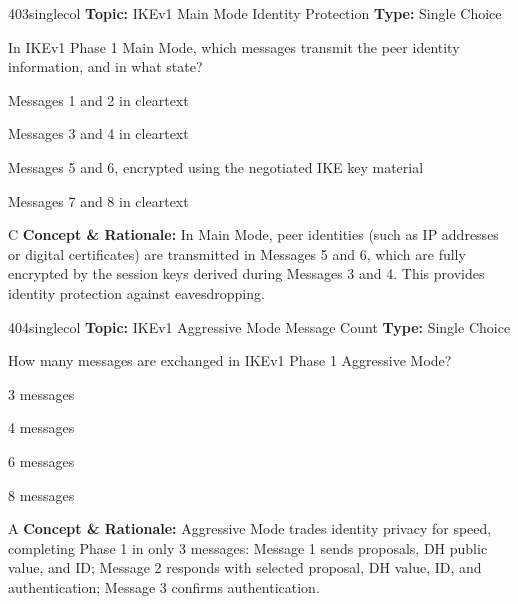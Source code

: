 \begin{qcard}{403}{singlecol}
\textcolor{darkslate!75}{\small\textbf{Topic:} IKEv1 Main Mode Identity Protection \hfill \textbf{Type:} Single Choice}\vspace{0.4em}\par
In IKEv1 Phase 1 Main Mode, which messages transmit the peer identity information, and in what state?
\begin{qoptions}
\item Messages 1 and 2 in cleartext
\item Messages 3 and 4 in cleartext
\item Messages 5 and 6, encrypted using the negotiated IKE key material
\item Messages 7 and 8 in cleartext
\end{qoptions}
\end{qcard}
\nopagebreak
\begin{explainbox}{C}
\textbf{Concept \& Rationale:} In Main Mode, peer identities (such as IP addresses or digital certificates) are transmitted in Messages 5 and 6, which are fully encrypted by the session keys derived during Messages 3 and 4. This provides identity protection against eavesdropping.
\end{explainbox}

\begin{qcard}{404}{singlecol}
\textcolor{darkslate!75}{\small\textbf{Topic:} IKEv1 Aggressive Mode Message Count \hfill \textbf{Type:} Single Choice}\vspace{0.4em}\par
How many messages are exchanged in IKEv1 Phase 1 Aggressive Mode?
\begin{qoptions}
\item 3 messages
\item 4 messages
\item 6 messages
\item 8 messages
\end{qoptions}
\end{qcard}
\nopagebreak
\begin{explainbox}{A}
\textbf{Concept \& Rationale:} Aggressive Mode trades identity privacy for speed, completing Phase 1 in only 3 messages: Message 1 sends proposals, DH public value, and ID; Message 2 responds with selected proposal, DH value, ID, and authentication; Message 3 confirms authentication.
\end{explainbox}

